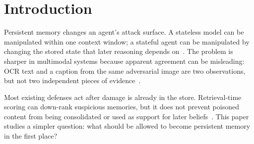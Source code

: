\documentclass{article}
\begin{document}
\section{Introduction}

Persistent memory changes an agent's attack surface. A stateless model can be manipulated within one context window; a stateful agent can be manipulated by changing the stored state that later reasoning depends on~\cite{ref1,ref2,memgraft,ref3,mpad}. The problem is sharper in multimodal systems because apparent agreement can be misleading: OCR text and a caption from the same adversarial image are two observations, but not two independent pieces of evidence~\cite{crossinject,visualtrap}.

Most existing defenses act after damage is already in the store. Retrieval-time scoring can down-rank suspicious memories, but it does not prevent poisoned content from being consolidated or used as support for later beliefs~\cite{ref4,ragpartmask,ref5,ref6,ref7}. This paper studies a simpler question: what should be allowed to become persistent memory in the first place?
\end{document}
